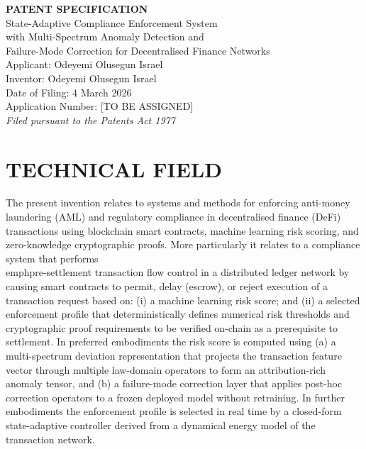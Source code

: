 \documentclass[12pt,a4paper]{article}
\begin{document}
\begin{center}
{\LARGE\bfseries PATENT SPECIFICATION}\\[1em]
{\Large State-Adaptive Compliance Enforcement System\\
with Multi-Spectrum Anomaly Detection and\\
Failure-Mode Correction for Decentralised Finance Networks}\\[2em]
{\large Applicant: Odeyemi Olusegun Israel}\\[0.5em]
{\large Inventor:  Odeyemi Olusegun Israel}\\[0.5em]
{\large Date of Filing: 4 March 2026}\\[0.5em]
{\large Application Number: [TO BE ASSIGNED]}\\[0.3em]
{\normalsize \textit{Filed pursuant to the Patents Act 1977}}
\end{center}

\vspace{2em}

\section{TECHNICAL FIELD}

The present invention relates to systems and methods for enforcing
anti-money laundering (AML) and regulatory compliance in decentralised
finance (DeFi) transactions using blockchain smart contracts, machine
learning risk scoring, and zero-knowledge cryptographic proofs. More
particularly it relates to a compliance system that performs \\emph{pre-settlement}
transaction flow control in a distributed ledger network by causing smart
contracts to permit, delay (escrow), or reject execution of a transaction
request based on: (i) a machine learning risk score; and (ii) a selected
enforcement profile that deterministically defines numerical risk thresholds
and cryptographic proof requirements to be verified on-chain as a
prerequisite to settlement. In preferred embodiments the risk score is
computed using (a) a multi-spectrum deviation representation that projects
the transaction feature vector through multiple law-domain operators to form
an attribution-rich anomaly tensor, and (b) a failure-mode correction layer
that applies post-hoc correction operators to a frozen deployed model
without retraining. In further embodiments the enforcement profile is
selected in real time by a closed-form state-adaptive controller derived
from a dynamical energy model of the transaction network.
\end{document}
